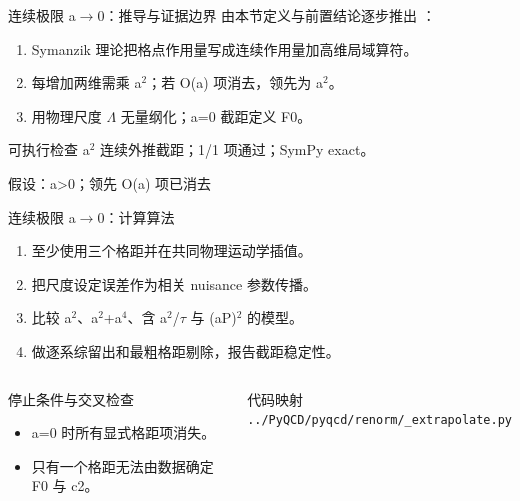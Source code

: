\begin{frame}[t]{连续极限 a\ensuremath{\rightarrow}0：推导与证据边界}
\footnotesize
{}\quad 由本节定义与前置结论逐步推出 ：
\begin{enumerate}
\item Symanzik 理论把格点作用量写成连续作用量加高维局域算符。
\item 每增加两维需乘 a\ensuremath{^{2}}；若 O(a) 项消去，领先为 a\ensuremath{^{2}}。
\item 用物理尺度 \ensuremath{\Lambda} 无量纲化；a=0 截距定义 F0。
\end{enumerate}\begin{block}{可执行检查}
\quad a\ensuremath{^{2}} 连续外推截距；1/1 项通过；SymPy exact。
\par\scriptsize 假设：a>0；领先 O(a) 项已消去
\end{block}
\end{frame}

\begin{frame}[t]{连续极限 a\ensuremath{\rightarrow}0：计算算法}
\footnotesize
{}\begin{enumerate}
\item 至少使用三个格距并在共同物理运动学插值。
\item 把尺度设定误差作为相关 nuisance 参数传播。
\item 比较 a\ensuremath{^{2}}、a\ensuremath{^{2}}+a\ensuremath{^{4}}、含 a\ensuremath{^{2}}/\allowbreak{}\ensuremath{\tau} 与 (aP)\ensuremath{^{2}} 的模型。
\item 做逐系综留出和最粗格距剔除，报告截距稳定性。
\end{enumerate}\begin{columns}[T,onlytextwidth]
\begin{block}{停止条件与交叉检查}\scriptsize\begin{itemize}
\item[\CheckMark] a=0 时所有显式格距项消失。
\item[\CheckMark] 只有一个格距无法由数据确定 F0 与 c2。
\end{itemize}\end{block}
\begin{block}{代码映射}
\scriptsize \texttt{.\allowbreak{}.\allowbreak{}/\allowbreak{}PyQCD/\allowbreak{}pyqcd/\allowbreak{}renorm/\allowbreak{}\_\allowbreak{}extrapolate.\allowbreak{}py}
\end{block}\end{columns}\end{frame}


